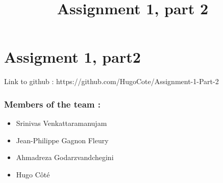 \documentclass[11pt]{article}
\title{Assignment 1, part 2}
\providecommand{\tightlist}{%
      \setlength{\itemsep}{0pt}\setlength{\parskip}{0pt}}
\begin{document}
    
    
    \maketitle
    
    

    
    \section{Assigment 1, part2}\label{assigment-1-part2}

Link to github : https://github.com/HugoCote/Assignment-1-Part-2

\subsubsection{Members of the team :}\label{members-of-the-team}

\begin{itemize}
\tightlist
\item
  Srinivas Venkattaramanujam\\
\item
  Jean-Philippe Gagnon Fleury\\
\item
  Ahmadreza Godarzvandchegini\\
\item
  Hugo Côté
\end{itemize}
\end{document}
